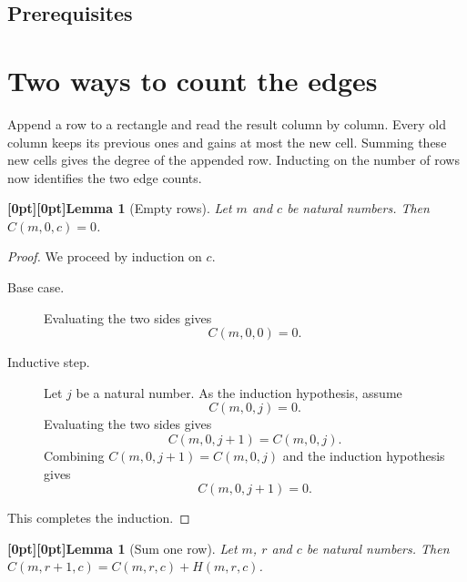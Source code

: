 \documentclass{article}
\makeatletter
\newcommand{\paperanchor}[1]{\hypertarget{#1}{}}%
\newcommand{\paperlink}[2]{\hyperlink{#1}{\begin{NoHyper}#2\end{NoHyper}}}%
\def\paperdest{\pdfextension dest}\def\paperstart{\pdfextension startlink}%
\def\paperend{\pdfextension endlink}\def\papercolor{\pdfextension colorstack}%
\let\paperdest\pdfdest\let\paperstart\pdfstartlink\let\paperend\pdfendlink\let\papercolor\pdfcolorstack
\newcommand{\paperanchor}[1]{\paperdest name{#1} xyz}%
\newcommand{\paperlink}[2]{\leavevmode\paperstart attr{/Border [0 0 0]} goto name{#1}%
      \papercolor 0 push {0.10 0.25 0.42 rg 0.10 0.25 0.42 RG}#2\papercolor 0 pop\paperend}%
\newcommand{\paperanchor}[1]{\special{pdf:dest (#1) [@thispage /XYZ null @ypos null]}}%
\newcommand{\paperlink}[2]{\leavevmode\special{pdf:bann << /Subtype /Link /Border [0 0 0] /A << /S /GoTo /D (#1) >> >>}%
      \special{color push rgb 0.10 0.25 0.42}#2\special{color pop}\special{pdf:eann}}%
\newcommand{\paperlineanchor}[1]{\raisebox{10pt}[0pt][0pt]{\paperanchor{#1}}}
\DeclareRobustCommand{\paperresultname}[1]{\paperlineanchor{theorem:\arabic{theorem}}#1}
\theoremstyle{paperresult}
\newcounter{paperpremise}
\newtheorem{lemma}[theorem]{\paperresultname{Lemma}}
\makeatother
\begin{document}
\subsection*{Prerequisites}

\section{Two ways to count the edges}
Append a row to a rectangle and read the result column by column. Every old column keeps its previous ones and gains at most the new cell. Summing these new cells gives the degree of the appended row. Inducting on the number of rows now identifies the two edge counts.

\begin{lemma}[{Empty rows}]\label{theorem:1}
Let \(m\) and \(c\) be natural numbers. Then \(C(m, 0, c) = 0\).
\end{lemma}

\begin{proof}
We proceed by induction on \(c\).
\begin{description}
\item[Base case.] Evaluating the two sides gives
\[
C(m, 0, 0) = 0.
\]
\item[Inductive step.] Let \(j\) be a natural number.
As the induction hypothesis, assume
\[
C(m, 0, j) = 0.
\]
Evaluating the two sides gives
\[
C(m, 0, j + 1) = C(m, 0, j).
\]
Combining \(C(m, 0, j + 1) = C(m, 0, j)\) and the induction hypothesis gives
\[
C(m, 0, j + 1) = 0.
\]
\end{description}
This completes the induction.
\end{proof}

\begin{lemma}[{Sum one row}]\label{theorem:2}
Let \(m\), \(r\) and \(c\) be natural numbers. Then \(C(m, r + 1, c) = C(m, r, c) + H(m, r, c)\).
\end{lemma}
\end{document}
